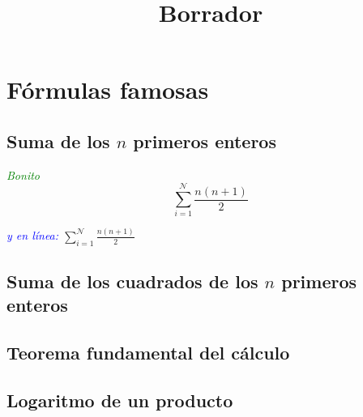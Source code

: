 \documentclass{article}
\author{}
\date{}
\title{Borrador}
\begin{document}
\maketitle


\begin{abstract}

\end{abstract}

\section{Fórmulas famosas}

\subsection{Suma de los $n$ primeros enteros}
\textit{\textcolor{green}{{\large B}{\small onito}}} \[ \sum_{i=1}^\mathcal{N} \frac{n(n+1)}{2} \]

\textit{\textcolor{blue}{y en línea: }}$\sum_{i=1}^\mathcal{N} \frac{n(n+1)}{2} $





\subsection{Suma de los cuadrados de los $n$ primeros enteros}


\subsection{Teorema fundamental del cálculo}


\subsection{Logaritmo de un producto}
\end{document}
